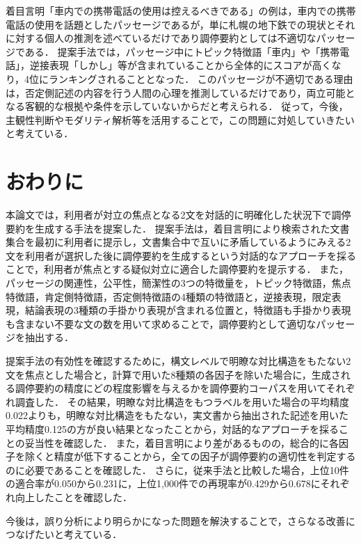 \documentclass[japanese]{jnlp_1.4}
\begin{document}
着目言明「車内での携帯電話の使用は控えるべきである」の例は，車内での携帯電話の使用を話題としたパッセージであるが，単に札幌の地下鉄での現状とそれに対する個人の推測を述べているだけであり調停要約としては不適切なパッセージである．
提案手法では，パッセージ中にトピック特徴語「車内」や「携帯電話」，逆接表現「しかし」等が含まれていることから全体的にスコアが高くなり，4位にランキングされることとなった．
このパッセージが不適切である理由は，否定側記述の内容を行う人間の心理を推測しているだけであり，両立可能となる客観的な根拠や条件を示していないからだと考えられる．
従って，今後，主観性判断\cite{Finn2001,Matsumoto2009}やモダリティ解析\cite{matsuyoshi2010}等を活用することで，この問題に対処していきたいと考えている．


\section{おわりに}
\label{sc:conclusion}

本論文では，利用者が対立の焦点となる2文を対話的に明確化した状況下で調停要約を生成する手法を提案した．
提案手法は，着目言明により検索された文書集合を最初に利用者に提示し，文書集合中で互いに矛盾しているようにみえる2文を利用者が選択した後に調停要約を生成するという対話的なアプローチを採ることで，利用者が焦点とする疑似対立に適合した調停要約を提示する．
また，パッセージの関連性，公平性，簡潔性の3つの特徴量を，トピック特徴語，焦点特徴語，肯定側特徴語，否定側特徴語の4種類の特徴語と，逆接表現，限定表現，結論表現の3種類の手掛かり表現が含まれる位置と，特徴語も手掛かり表現も含まない不要な文の数を用いて求めることで，調停要約として適切なパッセージを抽出する．

提案手法の有効性を確認するために，構文レベルで明瞭な対比構造をもたない2文を焦点とした場合と，計算で用いた8種類の各因子を除いた場合に，生成される調停要約の精度にどの程度影響を与えるかを調停要約コーパスを用いてそれぞれ調査した．
その結果，明瞭な対比構造をもつラベルを用いた場合の平均精度0.022よりも，明瞭な対比構造をもたない，実文書から抽出された記述を用いた平均精度0.125の方が良い結果となったことから，対話的なアプローチを採ることの妥当性を確認した．
また，着目言明により差があるものの，総合的に各因子を除くと精度が低下することから，全ての因子が調停要約の適切性を判定するのに必要であることを確認した．
さらに，従来手法と比較した場合，上位10件の適合率が0.050から0.231に，上位1,000件での再現率が0.429から0.678にそれぞれ向上したことを確認した．

今後は，誤り分析により明らかになった問題を解決することで，さらなる改善につなげたいと考えている．
\end{document}
